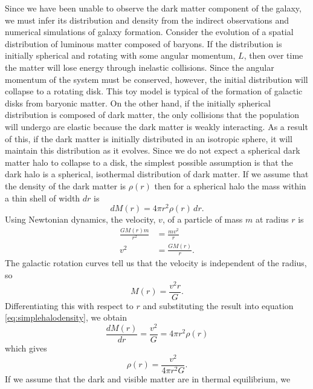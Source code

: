 Since we have been unable to observe the dark matter component of the galaxy,
we must infer its distribution and density from the indirect observations and
numerical simulations of galaxy formation. Consider the evolution of a spatial
distribution of luminous matter composed of baryons.  If the distribution is
initially spherical and rotating with some angular momentum, $L$, then over
time the matter will lose energy through inelastic collisions. Since the
angular momentum of the system must be conserved, however, the initial
distribution will collapse to a rotating disk.  This toy model is typical of
the formation of galactic disks from baryonic matter. On the other hand, if
the initially spherical distribution is composed of dark matter, the only
collisions that the population will undergo are elastic because the dark
matter is weakly interacting. As a result of this, if the dark matter is
initially distributed in an isotropic sphere, it will maintain this
distribution as it evolves. Since we do not expect a spherical dark matter
halo to collapse to a disk, the simplest possible assumption is that the dark
halo is a spherical, isothermal distribution of dark matter. If we assume that
the density of the dark matter is $\rho(r)$ then for a spherical halo the mass
within a thin shell of width $dr$ is
\begin{equation}
dM(r) = 4\pi r^2 \rho(r)\, dr.
\label{eq:simplehalodensity}
\end{equation}
Using Newtonian dynamics, the velocity, $v$, of a particle of mass $m$ at
radius $r$ is
\begin{equation}
\begin{split}
\frac{GM(r)m}{r^2} &= \frac{mv^2}{r} \\
v^2 &= \frac{GM(r)}{r}.
\end{split}
\end{equation}
The galactic rotation curves tell us that the velocity is independent of the
radius, so
\begin{equation}
M(r) = \frac{v^2r}{G}.
\end{equation}
Differentiating this with respect to $r$ and substituting the result into
equation \ref{eq:simplehalodensity}, we obtain
\begin{equation}
\frac{dM(r)}{dr} = \frac{v^2}{G} = 4\pi r^2\rho(r)
\end{equation}
which gives
\begin{equation}
\rho(r) = \frac{v^2}{4\pi r^2 G}.
\label{eq:simplehalodensity2}
\end{equation}
If we assume that the dark and visible matter are in thermal equilibrium, we
